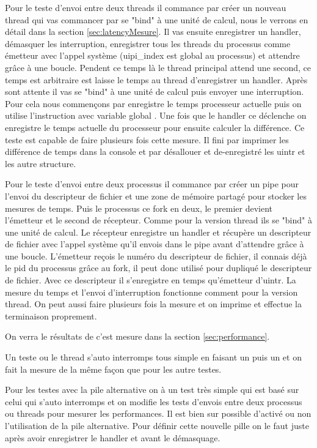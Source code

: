 Pour le teste d'envoi entre deux threads il commance par créer un nouveau thread qui vas commancer par se "bind" à une unité de calcul, nous le verrons en détail dans la section \ref{sec:latencyMesure}.
Il vas ensuite enregistrer un handler, démasquer les interruption, enregistrer tous les threads du processus comme émetteur avec l'appel système  (uipi_index est global au processus) et attendre grâce à une boucle.
Pendent ce temps là le thread principal attend une second, ce temps est arbitraire est laisse le temps au thread d'enregistrer un handler.
Après sont attente il vas se "bind" à une unité de calcul puis envoyer une interruption.
Pour cela nous commençons par enregistre le temps processeur actuelle puis on utilise l'instruction  avec variable global .
Une fois que le handler ce déclenche on enregistre le temps actuelle du processeur pour ensuite calculer la différence.
Ce teste est capable de faire plusieurs fois cette mesure.
Il fini par imprimer les différence de temps dans la console et par désallouer et de-enregistré les uintr et les autre structure.

Pour le teste d'envoi entre deux processus il commance par créer un pipe pour l'envoi du descripteur de fichier et une zone de mémoire partagé pour stocker les mesures de temps.
Puis le processus ce fork en deux, le premier devient l'émetteur et le second de récepteur.
Comme pour la version thread ils se "bind" à une unité de calcul.
Le récepteur enregistre un handler et récupère un descripteur de fichier avec l'appel système  qu'il envois dans le pipe avant d'attendre grâce à une boucle.
L'émetteur reçois le numéro du descripteur de fichier, il connais déjà le pid du processus grâce au fork, il peut donc utilisé  pour dupliqué le descripteur de fichier.
Avec ce descripteur il s'enregistre en temps qu'émetteur d'uintr.
La mesure du temps et l'envoi d'interruption fonctionne comment pour la version thread.
On peut aussi faire plusieurs fois la mesure et on imprime et effectue la terminaison proprement.

On verra le résultats de c'est mesure dans la section \ref{sec:performance}.

Un teste ou le thread s'auto interromps tous simple en faisant un  puis un  et on fait la mesure de la même façon que pour les autre testes.

Pour les testes avec la pile alternative on à un test très simple qui est basé sur celui qui s'auto interromps et on modifie les tests d'envois entre deux processus ou threads pour mesurer les performances.
Il est bien sur possible d'activé ou non l'utilisation de la pile alternative.
Pour définir cette nouvelle pille on le faut juste après avoir enregistrer le handler et avant le démasquage.


